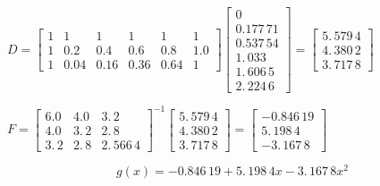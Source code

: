 \documentclass{article}
\begin{document}
$D=\left[ 
\begin{array}{cccccc}
1 & 1 & 1 & 1 & 1 & 1 \\ 
1 & 0.2 & 0.4 & 0.6 & 0.8 & 1.0 \\ 
1 & 0.04 & 0.16 & 0.36 & 0.64 & 1%
\end{array}%
\right] \left[ 
\begin{array}{c}
0 \\ 
0.177\,71 \\ 
\allowbreak \allowbreak \allowbreak 0.537\,54 \\ 
1.\,\allowbreak 033 \\ 
1.\,\allowbreak 606\,5 \\ 
\allowbreak \allowbreak 2.\,\allowbreak 224\,6%
\end{array}%
\right] =\allowbreak \left[ 
\begin{array}{c}
5.\,\allowbreak 579\,4 \\ 
4.\,\allowbreak 380\,2 \\ 
3.\,\allowbreak 717\,8%
\end{array}%
\right] \allowbreak $

$F=\left[ 
\begin{array}{ccc}
6.0 & 4.0 & 3.\,\allowbreak 2 \\ 
4.0 & 3.\,\allowbreak 2 & 2.\,\allowbreak 8 \\ 
3.\,\allowbreak 2 & 2.\,\allowbreak 8 & 2.\,\allowbreak 566\,4%
\end{array}%
\right] ^{-1}\left[ 
\begin{array}{c}
5.\,\allowbreak 579\,4 \\ 
4.\,\allowbreak 380\,2 \\ 
3.\,\allowbreak 717\,8%
\end{array}%
\right] \allowbreak =\allowbreak \left[ 
\begin{array}{c}
-0.846\,19 \\ 
5.\,\allowbreak 198\,4 \\ 
-3.\,\allowbreak 167\,8%
\end{array}%
\right] \allowbreak $

\[
g(x)=-0.846\,19+5.\,\allowbreak 198\,4x-3.\,\allowbreak 167\,8x^{2}
\]

\bigskip 

\bigskip 

\bigskip 

\bigskip 

\bigskip 

\bigskip 

\bigskip 
\end{document}
